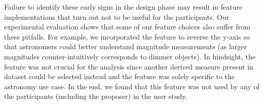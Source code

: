 {\par Failure to identify these early signs in the design phase may result in feature implementations that turn out not to be useful for the participants. 
Our experimental evaluation shows that some of our feature choices also suffer from these pitfalls. For example, we incorporated the feature to reverse the y-axis so that astronomers could better understand magnitude measurements (as larger magnitudes counter-intuitively corresponds to dimmer objects). In hindsight, the feature was not crucial for the analysis since another derived measure present in dataset could be selected instead and the feature was solely specific to the astronomy use case. In the end, we found that this feature was not used by any of the participants (including the proposer) in the user study.%
}